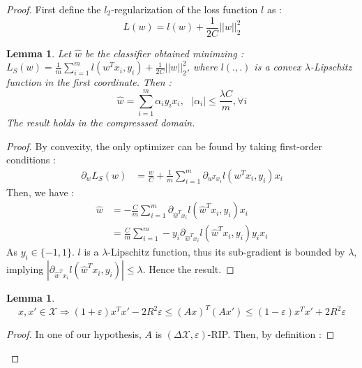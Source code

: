 \documentclass{article}
\newtheorem{lemma}[theorem]{Lemma}
\begin{document}
\begin{proof}
    First define the $l_2$-regularization of the loss function $l$ as :
    \[L(w) = l(w) + \frac{1}{2C}||w||_2^2\]
    \begin{lemma}
        Let $\hat{w}$ be the classifier obtained minimzing :
        $L_S(w) = \frac{1}{m} \sum_{i=1}^m l(w^Tx_i, y_i) + \frac{1}{2C}||w||_2^2 $,
        where $l(., .)$ is a convex $\lambda$-Lipschitz function in the first coordinate. 
        Then :
        \[\hat{w} = \sum_{i=1}^m \alpha_i y_i x_i , \ \ \
        |\alpha_i|\leq \frac{\lambda C}{m}, \forall i\]
        The result holds in the compresssed domain.
    \end{lemma}
    \begin{proof}
         By convexity, the only optimizer can be found
        by taking first-order conditions :
        \begin{align*}
            \partial_w L_S(w) &= 
                    \frac{w}{C} + \frac{1}{m} \sum_{i=1}^m \partial_{w^Tx_i} l(w^T x_i, y_i)x_i
        \end{align*}
        Then, we have :
        \begin{align*}
            \hat{w} &=- \frac{C}{m} \sum_{i=1}^m \partial_{\hat{w}^Tx_i} l(\hat{w}^T x_i, y_i)x_i \\
                    &= \frac{C}{m} \sum_{i=1}^m - y_i\partial_{\hat{w}^Tx_i} l(\hat{w}^T x_i, y_i) y_i x_i
        \end{align*}
        As $y_i\in \{-1, 1\}$. 
        $l$ is a $\lambda$-Lipschitz function, thus its sub-gradient 
        is bounded by $\lambda$, implying $|\partial_{\hat{w}^Tx_i} l(\hat{w}^T x_i, y_i)| \leq \lambda$. 
        Hence the result.
    \end{proof}
    \begin{lemma}
        \[ x, x' \in \mathcal{X} 
        \Rightarrow 
        (1+\varepsilon) x^Tx' - 2R^2 \varepsilon 
        \leq (Ax)^T (Ax') 
        \leq (1-\varepsilon) x^Tx' + 2R^2 \varepsilon 
        \]
    \end{lemma}
    \begin{proof}
        In one of our hypothesis, $A$ is $(\Delta \mathcal{X}, \varepsilon)$-RIP. 
        Then, by definition : 


\end{proof}
\end{proof}
\end{document}
